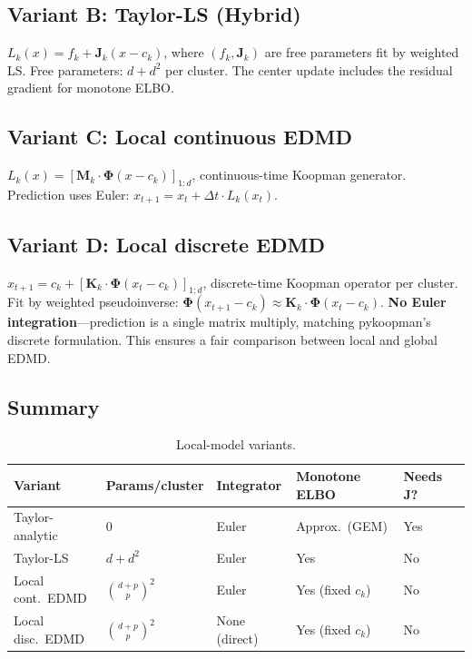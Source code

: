 \documentclass[11pt]{article}
\theoremstyle{definition}
\newcommand{\Phiv}{\boldsymbol{\Phi}}
\newcommand{\Mv}{\boldsymbol{M}}
\newcommand{\Jv}{\boldsymbol{J}}
\newcommand{\Kv}{\boldsymbol{K}}
\begin{document}
\subsection{Variant B: Taylor-LS (Hybrid)}

$L_k(x)=f_k+\Jv_k(x-c_k)$, where $(f_k,\Jv_k)$ are free parameters fit by weighted LS. Free parameters: $d+d^2$ per cluster. The center update includes the residual gradient for monotone ELBO.

\subsection{Variant C: Local continuous EDMD}

$L_k(x)=[\Mv_k\cdot\Phiv(x-c_k)]_{1:d}$, continuous-time Koopman generator. Prediction uses Euler: $x_{t+1}=x_t+\Delta t\cdot L_k(x_t)$.

\subsection{Variant D: Local discrete EDMD}

$\hat{x}_{t+1}=c_k+[\Kv_k\cdot\Phiv(x_t-c_k)]_{1:d}$, discrete-time Koopman operator per cluster. Fit by weighted pseudoinverse: $\Phiv(x_{t+1}-c_k)\approx\Kv_k\cdot\Phiv(x_t-c_k)$. \textbf{No Euler integration}---prediction is a single matrix multiply, matching pykoopman's discrete formulation. This ensures a fair comparison between local and global EDMD.

\subsection{Summary}

\begin{table}[H]
\centering\small
\begin{tabular}{llllll}
\toprule
Variant & Params/cluster & Integrator & Monotone ELBO & Needs $\Jv$? \\
\midrule
Taylor-analytic & 0 & Euler & Approx.\ (GEM) & Yes \\
Taylor-LS & $d+d^2$ & Euler & Yes & No \\
Local cont.\ EDMD & $\binom{d+p}{p}^2$ & Euler & Yes (fixed $c_k$) & No \\
Local disc.\ EDMD & $\binom{d+p}{p}^2$ & None (direct) & Yes (fixed $c_k$) & No \\
\bottomrule
\end{tabular}
\caption{Local-model variants.}
\end{table}
\end{document}
